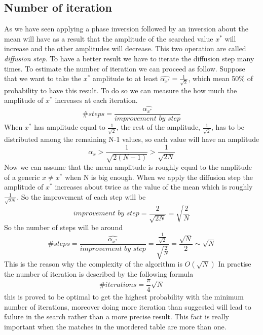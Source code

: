 \documentclass[main.tex]{subfiles}
\theoremstyle{definition}
\begin{document}
\subsection{Number of iteration}
As we have seen applying a phase inversion followed by an inversion about the mean will have as a result that the amplitude of the searched value $x^*$ will increase and the other amplitudes will decrease. This two operation are called \textit{diffusion step}.
To have a better result we have to iterate the diffusion step many times. To estimate the number of iteration we can proceed as follow. 
Suppose that we want to take the $x^*$ amplitude to at least $\widehat{\alpha_{x^{*}}}=\frac{1}{\sqrt{2}}$, which mean 50\% of probability to have this result.
To do so we can measure the how much the amplitude of $x^*$ increases at each iteration.
$$\textit{\#steps}=\frac{\widehat{\alpha_{x^{*}}}}{\textit{improvement by step}}$$
When $x^*$ has amplitude equal to $\frac{1}{\sqrt{2}}$, the rest of the amplitude, $\frac{1}{\sqrt{2}}$, has to be distributed among the remaining N-1 values, so each value will have an amplitude
$$ \alpha_x >\frac{1}{\sqrt{2(N-1)}}> \frac{1}{\sqrt{2N}}$$
Now we can assume that the mean amplitude is roughly equal to the amplitude of a generic $x\neq x^*$ when N is big enough.
When we apply the diffusion step the amplitude of $x^*$ increases about twice as the value of the mean which is roughly $\frac{1}{\sqrt{2N}}$. So the improvement of each step will be
\begin{equation}
\textit{improvement by step}=\frac{2}{\sqrt{2N}}=\sqrt{\frac{2}{N}}
\end{equation}
So the number of steps will be around
\begin{equation}
\textit{\#steps}=\frac{\widehat{\alpha_{x^{*}}}}{\textit{improvement by step}}=\frac{\frac{1}{\sqrt{2}}}{\sqrt{\frac{2}{N}}}=\frac{\sqrt{N}}{2}\sim\sqrt{N}
\end{equation}
This is the reason why the complexity of the algorithm is $O(\sqrt{N})$
In practise the number of iteration is described by the following formula
\begin{equation}
\textit{\# iterations}=\frac{\pi}{4}\sqrt{N}
\end{equation}
this is proved to be optimal to get the highest probability with the minimum number of iterations, moreover doing more iteration than suggested will lead to failure in the search rather than a more precise result. This fact is really important when the matches in the unordered table are more than one.
\end{document}
